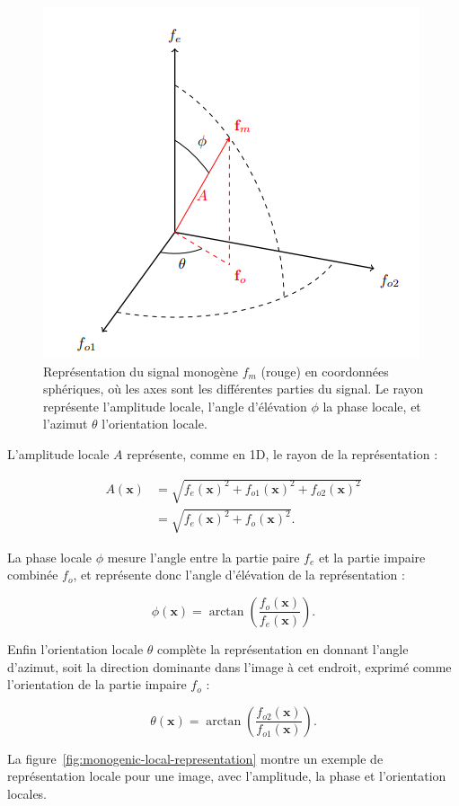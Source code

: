 \begin{figure}
    \centering
    \includegraphics[width=.45\textwidth]{contenu/resources/images/spherical_representation}
    \caption[Représentation du signal monogène en coordonnées sphériques]{Représentation du signal monogène $f_m$ (rouge) en coordonnées sphériques, où les axes sont les différentes parties du signal. Le rayon représente l'amplitude locale, l'angle d'élévation $\phi$ la phase locale, et l'azimut $\theta$ l'orientation locale.}
    \label{fig:spherical-representation}
\end{figure}

L'amplitude locale $A$ représente, comme en 1D, le rayon de la représentation :

\begin{align}
    A(\mathbf{x}) &= \sqrt{f_e(\mathbf{x})^2 + f_{o1}(\mathbf{x})^2 + f_{o2}(\mathbf{x})^2} \\
    &= \sqrt{f_e(\mathbf{x})^2 + f_o(\mathbf{x})^2}.
\end{align}

La phase locale $\phi$ mesure l'angle entre la partie paire $f_e$ et la partie impaire combinée $f_o$, et représente donc l'angle d'élévation de la représentation :

\begin{equation}
    \phi(\mathbf{x}) = \arctan\left(\frac{f_o(\mathbf{x})}{f_e(\mathbf{x})}\right).
\end{equation}

Enfin l'orientation locale $\theta$ complète la représentation en donnant l'angle d'azimut, soit la direction dominante dans l'image à cet endroit, exprimé comme l'orientation de la partie impaire $f_o$ :

\begin{equation}
    \theta(\mathbf{x}) = \arctan\left(\frac{f_{o2}(\mathbf{x})}{f_{o1}(\mathbf{x})}\right).
\end{equation}

La figure~\ref{fig:monogenic-local-representation} montre un exemple de représentation locale pour une image, avec l'amplitude, la phase et l'orientation locales.

